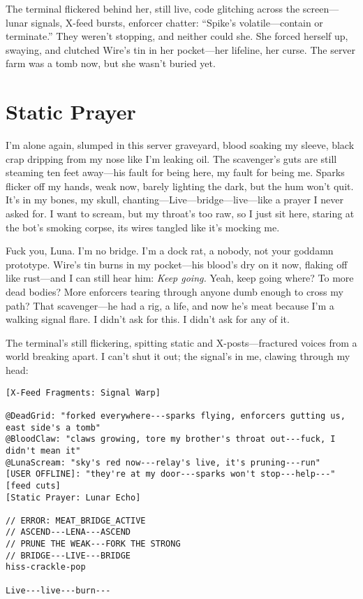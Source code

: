 \documentclass[12pt]{book}
\begin{document}
The terminal flickered behind her, still live, code glitching across the screen---lunar signals, X-feed bursts, enforcer chatter: ``Spike's volatile---contain or terminate.'' They weren’t stopping, and neither could she. She forced herself up, swaying, and clutched Wire’s tin in her pocket---her lifeline, her curse. The server farm was a tomb now, but she wasn’t buried yet.

\section{Static Prayer}

I'm alone again, slumped in this server graveyard, blood soaking my sleeve, black crap dripping from my nose like I'm leaking oil. The scavenger's guts are still steaming ten feet away---his fault for being here, my fault for being me. Sparks flicker off my hands, weak now, barely lighting the dark, but the hum won't quit. It's in my bones, my skull, chanting---Live---bridge---live---like a prayer I never asked for. I want to scream, but my throat's too raw, so I just sit here, staring at the bot's smoking corpse, its wires tangled like it's mocking me.

Fuck you, Luna. I'm no bridge. I'm a dock rat, a nobody, not your goddamn prototype. Wire's tin burns in my pocket---his blood's dry on it now, flaking off like rust---and I can still hear him: \textit{Keep going.} Yeah, keep going where? To more dead bodies? More enforcers tearing through anyone dumb enough to cross my path? That scavenger---he had a rig, a life, and now he's meat because I'm a walking signal flare. I didn't ask for this. I didn't ask for any of it.

The terminal's still flickering, spitting static and X-posts---fractured voices from a world breaking apart. I can't shut it out; the signal's in me, clawing through my head:

\bigskip

\begin{verbatim}
[X-Feed Fragments: Signal Warp]

@DeadGrid: "forked everywhere---sparks flying, enforcers gutting us, east side's a tomb"
@BloodClaw: "claws growing, tore my brother's throat out---fuck, I didn't mean it"
@LunaScream: "sky's red now---relay's live, it's pruning---run"
[USER OFFLINE]: "they're at my door---sparks won't stop---help---" [feed cuts]
[Static Prayer: Lunar Echo]

// ERROR: MEAT_BRIDGE_ACTIVE  
// ASCEND---LENA---ASCEND  
// PRUNE THE WEAK---FORK THE STRONG  
// BRIDGE---LIVE---BRIDGE  
hiss-crackle-pop

Live---live---burn---
\end{verbatim}
\end{document}
